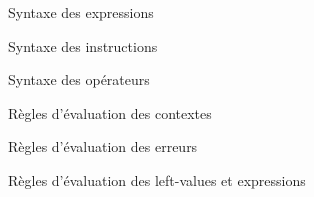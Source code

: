 \begin{figure}
\figstxdata{}
\caption{Syntaxe des expressions}
\end{figure}

\begin{figure}
\figstxinstr{}
\caption{Syntaxe des instructions}
\end{figure}

\begin{figure}[h]
\figstxops{}

\caption{Syntaxe des opérateurs}
\end{figure}

\begin{figure}
\begin{mathpar}
\end{mathpar}

    \figctx{}

\caption{Règles d'évaluation des contextes}
\end{figure}

\begin{figure}

\begin{mathpar}




\end{mathpar}

\caption{Règles d'évaluation des erreurs}
\end{figure}

\begin{figure}

\begin{mathpar}
















\end{mathpar}

\caption{Règles d'évaluation des left-values et expressions }
\end{figure}


